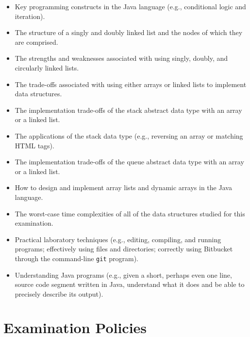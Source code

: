\vspace*{-.05in}
\begin{itemize}

  \itemsep 0in

  \item Key programming constructs in the Java language (e.g., conditional logic and iteration).

  \item The structure of a singly and doubly linked list and the nodes of which they are comprised.

  \item The strengths and weaknesses associated with using singly, doubly, and circularly linked lists.

  \item The trade-offs associated with using either arrays or linked lists to implement data structures.

  \item The implementation trade-offs of the stack abstract data type with an array or a linked list.

  \item The applications of the stack data type (e.g., reversing an array or matching HTML tags).

  \item The implementation trade-offs of the queue abstract data type with an array or a linked list.

  \item How to design and implement array lists and dynamic arrays in the Java language.

  \item The worst-case time complexities of all of the data structures studied for this examination.

  \item Practical laboratory techniques (e.g., editing, compiling, and running programs; effectively using files and
    directories; correctly using Bitbucket through the command-line {\tt git} program).

  \item Understanding Java programs (e.g., given a short, perhaps even one line, source code segment written in Java,
    understand what it does and be able to precisely describe its output).


\end{itemize}

\section*{Examination Policies}

